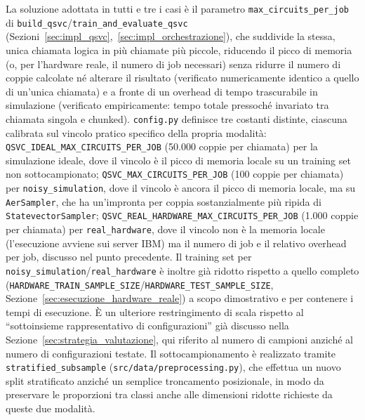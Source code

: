 \begin{itemize}
    La soluzione adottata in tutti e tre i casi è il parametro \newline\texttt{max\_circuits\_per\_job} di \texttt{build\_qsvc}/\texttt{train\_and\_evaluate\_qsvc} (Sezioni~\ref{sec:impl_qsvc},~\ref{sec:impl_orchestrazione}), che suddivide la stessa, unica chiamata logica in più chiamate più piccole, riducendo il picco di memoria (o, per l'hardware reale, il numero di job necessari) senza ridurre il numero di coppie calcolate né alterare il risultato (verificato numericamente identico a quello di un'unica chiamata) e a fronte di un overhead di tempo trascurabile in simulazione (verificato empiricamente: tempo totale pressoché invariato tra chiamata singola e chunked). \texttt{config.py} definisce tre costanti distinte, ciascuna calibrata sul vincolo pratico specifico della propria modalità: \texttt{QSVC\_IDEAL\_MAX\_CIRCUITS\_PER\_JOB} (50.000 coppie per chiamata) per la simulazione ideale, dove il vincolo è il picco di memoria locale su un training set non sottocampionato; \newline\texttt{QSVC\_MAX\_CIRCUITS\_PER\_JOB} (100 coppie per chiamata) per \newline\texttt{noisy\_simulation}, dove il vincolo è ancora il picco di memoria locale, ma su \texttt{AerSampler}, che ha un'impronta per coppia sostanzialmente più ripida di \texttt{StatevectorSampler}; \newline\texttt{QSVC\_REAL\_HARDWARE\_MAX\_CIRCUITS\_PER\_JOB} (1.000 coppie per chiamata) per \texttt{real\_hardware}, dove il vincolo non è la memoria locale (l'esecuzione avviene sui server IBM) ma il numero di job e il relativo overhead per job, discusso nel punto precedente. Il training set per \newline\texttt{noisy\_simulation}/\texttt{real\_hardware} è inoltre già ridotto rispetto a quello completo (\texttt{HARDWARE\_TRAIN\_SAMPLE\_SIZE}/\texttt{HARDWARE\_TEST\_SAMPLE\_SIZE},
    \newline Sezione~\ref{sec:esecuzione_hardware_reale}) a scopo dimostrativo e per contenere i tempi di esecuzione. È un ulteriore restringimento di scala rispetto al ``sottoinsieme rappresentativo di configurazioni'' già discusso nella Sezione~\ref{sec:strategia_valutazione}, qui riferito al numero di campioni anziché al numero di configurazioni testate. Il sottocampionamento è realizzato tramite \texttt{stratified\_subsample} (\texttt{src/data/preprocessing.py}), che effettua un nuovo split stratificato anziché un semplice troncamento posizionale, in modo da preservare le proporzioni tra classi anche alle dimensioni ridotte richieste da queste due modalità.


\end{itemize}
